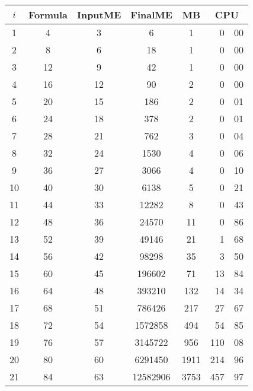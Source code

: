 \begin{tabular}{|c|c|c|c|c|r@{.}l|} \hline
$i$ & Formula & InputME & FinalME & MB & \multicolumn{2}{c|}{CPU}\\
\hline 
1 & 4 & 3 & 6 & 1 & 0&00\\
2 & 8 & 6 & 18 & 1 & 0&00\\
3 & 12 & 9 & 42 & 1 & 0&00\\
4 & 16 & 12 & 90 & 2 & 0&00\\
5 & 20 & 15 & 186 & 2 & 0&01\\
6 & 24 & 18 & 378 & 2 & 0&01\\
7 & 28 & 21 & 762 & 3 & 0&04\\
8 & 32 & 24 & 1530 & 4 & 0&06\\
9 & 36 & 27 & 3066 & 4 & 0&10\\
10 & 40 & 30 & 6138 & 5 & 0&21\\
11 & 44 & 33 & 12282 & 8 & 0&43\\
12 & 48 & 36 & 24570 & 11 & 0&86\\
13 & 52 & 39 & 49146 & 21 & 1&68\\
14 & 56 & 42 & 98298 & 35 & 3&50\\
15 & 60 & 45 & 196602 & 71 & 13&84\\
16 & 64 & 48 & 393210 & 132 & 14&34\\
17 & 68 & 51 & 786426 & 217 & 27&67\\
18 & 72 & 54 & 1572858 & 494 & 54&85\\
19 & 76 & 57 & 3145722 & 956 & 110&08\\
20 & 80 & 60 & 6291450 & 1911 & 214&96\\
21 & 84 & 63 & 12582906 & 3753 & 457&97\\
\hline
\end{tabular}
